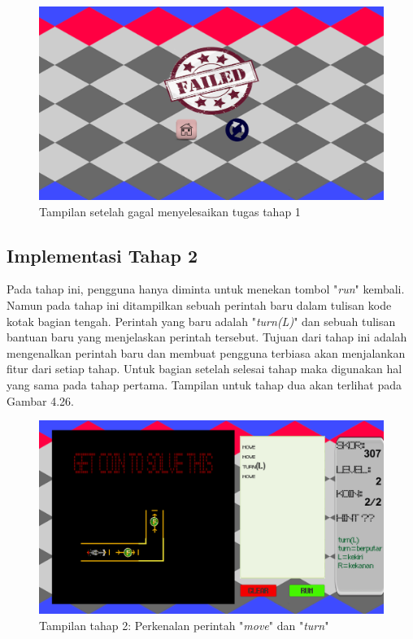 	\begin{figure}
		\centering
		\includegraphics[width=\linewidth-40pt]{pics/prototipe/ending2}
		\caption{Tampilan setelah gagal menyelesaikan tugas tahap 1}
	\end{figure}
	\subsection{Implementasi Tahap 2}
	Pada tahap ini, pengguna hanya diminta untuk menekan tombol "\textit{run}" kembali. Namun pada tahap ini ditampilkan sebuah perintah baru dalam tulisan kode kotak bagian tengah. Perintah yang baru adalah "\textit{turn(L)}" dan sebuah tulisan bantuan baru yang menjelaskan perintah tersebut. Tujuan dari tahap ini adalah mengenalkan perintah baru dan membuat pengguna terbiasa akan menjalankan fitur dari setiap tahap. Untuk bagian setelah selesai tahap maka digunakan hal yang sama pada tahap pertama. Tampilan untuk tahap dua akan terlihat pada Gambar 4.26.
	\begin{figure}
		\centering
		\includegraphics[width=\linewidth-40pt]{pics/prototipe/tahap2}
		\caption{Tampilan tahap 2: Perkenalan perintah "\textit{move}" dan "\textit{turn}"}
	\end{figure}
